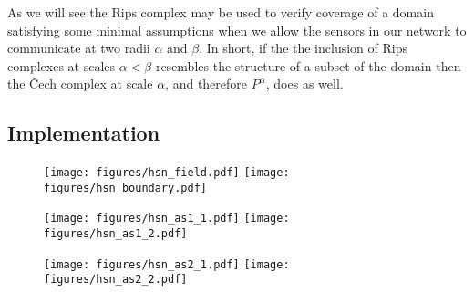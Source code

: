 
As we will see the Rips complex may be used to verify coverage of a domain satisfying some minimal assumptions when we allow the sensors in our network to communicate at two radii $\alpha$ and $\beta$.
In short, if the the inclusion of Rips complexes at scales $\alpha < \beta$ resembles the structure of a subset of the domain then the \v Cech complex at scale $\alpha$, and therefore $P^\alpha$, does as well.

\subsection{Implementation}

\begin{figure}[htbp]
\centering
    \texttt{[image: figures/hsn\_field.pdf]}
    \texttt{[image: figures/hsn\_boundary.pdf]}
    \caption{}
    \label{fig:hsn}
\end{figure}

\begin{figure}[htbp]
\centering
    \texttt{[image: figures/hsn\_as1\_1.pdf]}
    \texttt{[image: figures/hsn\_as1\_2.pdf]}
    \caption{}
    \label{fig:hsn_as1}
\end{figure}

\begin{figure}[htbp]
\centering
    \texttt{[image: figures/hsn\_as2\_1.pdf]}
    \texttt{[image: figures/hsn\_as2\_2.pdf]}
     \caption{}
     \label{fig:hsn_as2}
 \end{figure}

